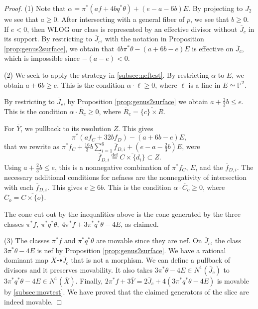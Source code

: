 \documentclass[12pt]{amsart}
\theoremstyle{definition}
\newcommand{\bb}{\ensuremath{\mathfrak{b}}}
\renewcommand{\geq}{\geqslant}
\renewcommand{\leq}{\leqslant}
\newcommand{\deq}{\ensuremath{\stackrel{\textrm{def}}{=}}}
\newcommand{\?}{ \circled{{\large\bf ?}}}
\let\bb\mathbb
\begin{document}
\begin{proof}
	(1) Note that $\alpha=\pi^*(af+4bq^*\theta)+(e-a-6b)E$. By projecting to $J_2$ we see that $a\geq 0$. After intersecting with a general fiber of $p$, we see that $b\geq 0$. If $e<0$, then WLOG our class is represented by an effective divisor without $\overline J_c$ in its support. By restricting to $\overline J_c$, with the notation in Proposition \ref{prop:genus2surface}, we obtain that $4b\pi^*\theta-(a+6b-e)E$ is effective on $\overline J_c$, which is impossible since $-(a-e)<0$. 
	
	(2) We seek to apply the strategy in \ref{subsec:neftest}. By restricting $\alpha$ to $E$, we obtain $a+6b\geq e$.
	This is the condition $\alpha\cdot\ell\geq 0$, where $\ell$ is a line in $E\simeq\bb P^2$.	
	
	By restricting to $\overline J_c$, by Proposition \ref{prop:genus2surface} we obtain $a+\frac 23b\leq e$. This is the condition $\alpha\cdot{\overline R}_c\geq 0$, where $\overline R_c=\overline{\{c\}\times R}$. 
	
	For $\overline Y$, we pullback to its resolution $Z$. This gives  \[\pi^*(af_C+32bf_D)-(a+6b-e)E,\] 
	that we rewrite as $\pi^*f_C+\frac{16}3b\sum_{i=1}^6\overline f_{D,i}+(e-a-\frac 23b)E$, were 
	\[\overline f_{D,i}\deq\overline{C\times\{d_i\}}\subset Z.\] 
	Using $a+\frac 23b\leq e$, this is a nonnegative combination of $\pi^*f_C$, $E$, and the $\overline f_{D,i}$. The necessary additional conditions for nefness are the nonnegativity of intersection with each $\overline f_{D,i}$. This gives $e\geq 6b$. This is the condition $\alpha\cdot\overline C_o\geq 0$, where $\overline C_o=\overline{C\times\{o\}}$.
	
	The cone cut out by the inequalities above is the cone generated by the three classes $\pi^*f,\ \pi^*q^*\theta,\ 4\pi^*f+3\pi^*q^*\theta-4E$, as claimed.
	
	(3) The classes $\pi^*f$ and $\pi^*q^*\theta$ are movable since they are nef. %
	On $\overline J_c$, the class $3\pi^*\theta-4E$ is nef by Proposition \ref{prop:genus2surface}.
	We have a rational dominant map $\overline X\dashrightarrow\overline J_c$ that is not a morphism. We can define a pullback of divisors and it preserves movability. It also takes  $3\pi^*\theta-4E\in N^1(\overline J_c)$ to $3\pi^*q^*\theta-4E\in N^1(\overline X)$.
	 Finally, $2\pi^*f+3\overline Y=2\overline J_c+4(3\pi^*q^*\theta-4E)$  is movable by \ref{subsec:movtest}. We have proved that the claimed generators of the slice are indeed movable.
	

\end{proof}
\end{document}
